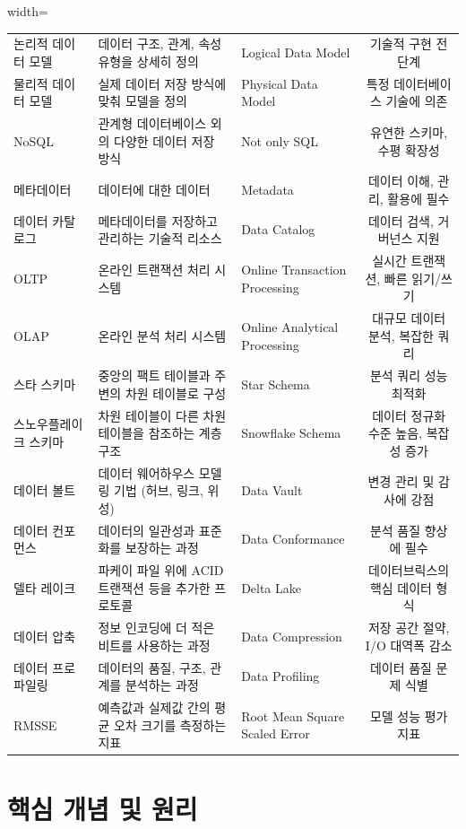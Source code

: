 \documentclass[11pt,a4paper]{article}
\begin{document}
\begin{table}[h!]
\begin{adjustbox}{width=\textwidth}
\begin{tabular}{lllc}
논리적 데이터 모델 & 데이터 구조, 관계, 속성 유형을 상세히 정의 & Logical Data Model & 기술적 구현 전 단계 \\
물리적 데이터 모델 & 실제 데이터 저장 방식에 맞춰 모델을 정의 & Physical Data Model & 특정 데이터베이스 기술에 의존 \\
NoSQL & 관계형 데이터베이스 외의 다양한 데이터 저장 방식 & Not only SQL & 유연한 스키마, 수평 확장성 \\
메타데이터 & 데이터에 대한 데이터 & Metadata & 데이터 이해, 관리, 활용에 필수 \\
데이터 카탈로그 & 메타데이터를 저장하고 관리하는 기술적 리소스 & Data Catalog & 데이터 검색, 거버넌스 지원 \\
OLTP & 온라인 트랜잭션 처리 시스템 & Online Transaction Processing & 실시간 트랜잭션, 빠른 읽기/쓰기 \\
OLAP & 온라인 분석 처리 시스템 & Online Analytical Processing & 대규모 데이터 분석, 복잡한 쿼리 \\
스타 스키마 & 중앙의 팩트 테이블과 주변의 차원 테이블로 구성 & Star Schema & 분석 쿼리 성능 최적화 \\
스노우플레이크 스키마 & 차원 테이블이 다른 차원 테이블을 참조하는 계층 구조 & Snowflake Schema & 데이터 정규화 수준 높음, 복잡성 증가 \\
데이터 볼트 & 데이터 웨어하우스 모델링 기법 (허브, 링크, 위성) & Data Vault & 변경 관리 및 감사에 강점 \\
데이터 컨포먼스 & 데이터의 일관성과 표준화를 보장하는 과정 & Data Conformance & 분석 품질 향상에 필수 \\
델타 레이크 & 파케이 파일 위에 ACID 트랜잭션 등을 추가한 프로토콜 & Delta Lake & 데이터브릭스의 핵심 데이터 형식 \\
데이터 압축 & 정보 인코딩에 더 적은 비트를 사용하는 과정 & Data Compression & 저장 공간 절약, I/O 대역폭 감소 \\
데이터 프로파일링 & 데이터의 품질, 구조, 관계를 분석하는 과정 & Data Profiling & 데이터 품질 문제 식별 \\
RMSSE & 예측값과 실제값 간의 평균 오차 크기를 측정하는 지표 & Root Mean Square Scaled Error & 모델 성능 평가 지표 \\
\bottomrule
\end{tabular}
\end{adjustbox}
\end{table}

\newpage
\section{핵심 개념 및 원리}
\end{document}
